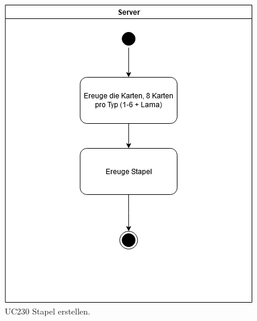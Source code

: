 \begin{figure}[h]
	\centering
	\includegraphics[width=\textwidth]{ad/UC230_Stapel_erstellen_v2.png}
	\caption{UC230 Stapel erstellen.}
\end{figure}

